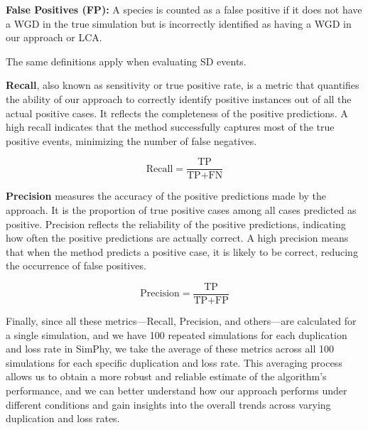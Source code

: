 \documentclass[10pt]{article}
\begin{document}
\textbf{False Positives (FP):} A species is counted as a false positive if it does not have a WGD in the true simulation but is incorrectly identified as having a WGD in our approach or LCA.

The same definitions apply when evaluating SD events.

\textbf{Recall}, also known as sensitivity or true positive rate, is a metric that quantifies the ability of our approach to correctly identify positive instances out of all the actual positive cases. It reflects the completeness of the positive predictions. A high recall indicates that the method successfully captures most of the true positive events, minimizing the number of false negatives.

$$
\text{Recall} = \frac{\text{TP}}{\text{TP+FN}}
$$

\textbf{Precision} measures the accuracy of the positive predictions made by the approach. It is the proportion of true positive cases among all cases predicted as positive. Precision reflects the reliability of the positive predictions, indicating how often the positive predictions are actually correct. A high precision means that when the method predicts a positive case, it is likely to be correct, reducing the occurrence of false positives.

$$
\text{Precision} = \frac{\text{TP}}{\text{TP+FP}}
$$

Finally, since all these metrics—Recall, Precision, and others—are calculated for a single simulation, and we have 100 repeated simulations for each duplication and loss rate in SimPhy, we take the average of these metrics across all 100 simulations for each specific duplication and loss rate. This averaging process allows us to obtain a more robust and reliable estimate of the algorithm's performance, and we can better understand how our approach performs under different conditions and gain insights into the overall trends across varying duplication and loss rates.
\end{document}
